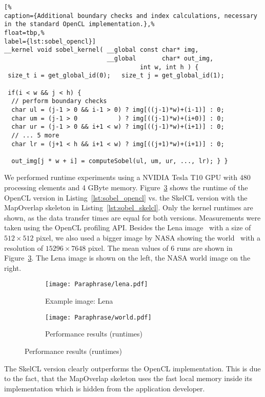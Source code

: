 \begin{lstlisting}[%
caption={Additional boundary checks and index calculations, necessary in the standard OpenCL implementation.},%
float=tbp,%
label={lst:sobel_opencl}]
__kernel void sobel_kernel( __global const char* img,
                            __global       char* out_img,
                                     int w, int h ) {
 size_t i = get_global_id(0);   size_t j = get_global_id(1);

 if(i < w && j < h) {
  // perform boundary checks
  char ul = (j-1 > 0 && i-1 > 0) ? img[((j-1)*w)+(i-1)] : 0;
  char um = (j-1 > 0           ) ? img[((j-1)*w)+(i+0)] : 0;
  char ur = (j-1 > 0 && i+1 < w) ? img[((j-1)*w)+(i+1)] : 0;
  // ... 5 more
  char lr = (j+1 < h && i+1 < w) ? img[((j+1)*w)+(i+1)] : 0;

  out_img[j * w + i] = computeSobel(ul, um, ur, ..., lr); } }
\end{lstlisting}

We performed runtime experiments using a NVIDIA Tesla T10 GPU with 480 processing elements and 4 GByte memory.
Figure~\ref{fig:measurements} shows the runtime of the OpenCL version in Listing~\ref{lst:sobel_opencl} vs. the SkelCL version with the MapOverlap skeleton in Listing~\ref{lst:sobel_skelcl}.
Only the kernel runtimes are shown, as the data transfer times are equal for both versions.
Measurements were taken using the OpenCL profiling API.
Besides the Lena image~\cite{Lena} with a size of $512\times 512$ pixel, we also used a bigger image by NASA showing the world~\cite{NASA} with a resolution of $15296\times 7648$ pixel.
The mean values of 6 runs are shown in Figure~\ref{fig:measurements}.
The Lena image is shown on the left, the NASA world image on the right.

\begin{figure}[tb]
  \centering
  \begin{subfigure}[t]{.45\textwidth}
    \texttt{[image: Paraphrase/lena.pdf]}
    \caption{Example image: Lena}
    \label{fig:measurements:lena}
  \end{subfigure}
  \hfill
  \begin{subfigure}[t]{.45\textwidth}
    \texttt{[image: Paraphrase/world.pdf]}
    \caption{Performance results (runtimes)}
    \label{fig:measurements:world}
  \end{subfigure}
  \caption{Performance results (runtimes)}
  \label{fig:measurements}
\end{figure}

The SkelCL version clearly outperforms the OpenCL implementation.
This is due to the fact, that the MapOverlap skeleton uses the fast local memory inside its implementation which is hidden from the application developer.

